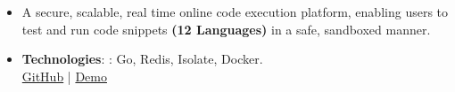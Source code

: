 \begin{itemize}
\normalsize

\item A secure, scalable, real time online code execution platform, enabling users to test and run code snippets \textbf{(12 Languages)} in a safe, sandboxed manner.
\item \textbf{Technologies}: : Go, Redis, Isolate, Docker.\\
\textcolor{blue}{\href{https://github.com/shaiq-dev/code}{GitHub}} | \textcolor{blue}{\href{https://code.shaiqkar.dev}{Demo}}

\end{itemize}
\smallskip
